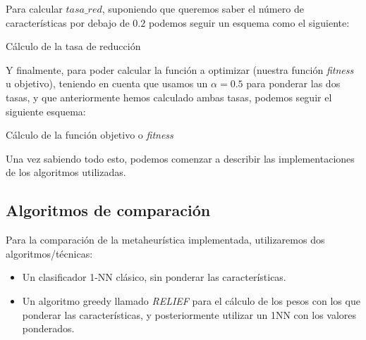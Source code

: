 \documentclass[11pt,a4paper]{article}
\begin{document}
Para calcular $tasa\_red$, suponiendo que queremos saber el número de características por debajo de $0.2$ podemos seguir un
esquema como el siguiente:

\begin{algorithm}[H]
\caption{Cálculo de la tasa de reducción}


\end{algorithm}

Y finalmente, para poder calcular la función a optimizar (nuestra función \textit{fitness} u objetivo), teniendo en cuenta que
usamos un $\alpha = 0.5$ para ponderar las dos tasas, y que anteriormente hemos calculado ambas tasas, podemos seguir el
siguiente esquema:

\begin{algorithm}[H]
\caption{Cálculo de la función objetivo o \textit{fitness}}

\end{algorithm}

Una vez sabiendo todo esto, podemos comenzar a describir las implementaciones de los algoritmos utilizadas.

\subsection{Algoritmos de comparación}

Para la comparación de la metaheurística implementada, utilizaremos dos algoritmos/técnicas:

\begin{itemize}[label=\textbullet]
	\item Un clasificador 1-NN clásico, sin ponderar las características.
	\item Un algoritmo greedy llamado \textit{RELIEF} para el cálculo de los pesos con los que ponderar las características,
	y posteriormente utilizar un 1NN con los valores ponderados.
\end{itemize}
\end{document}
